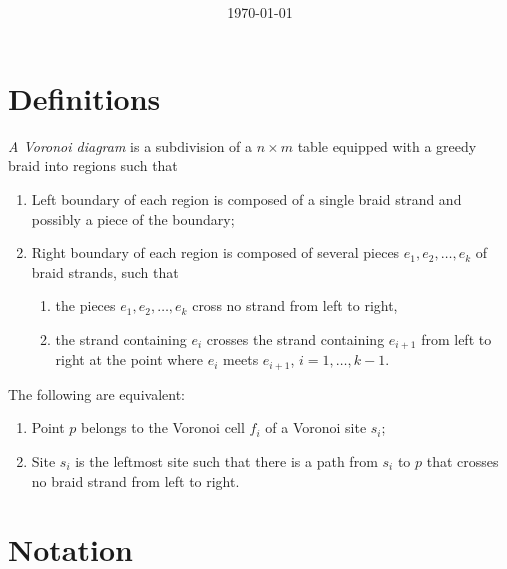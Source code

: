 \documentclass[a4paper,11pt]{article}
\title{ }
\author{ }
\date{\today}
\begin{document}
 \maketitle

\section{Definitions}

\begin{definition}
	\emph{A Voronoi diagram} is a subdivision of a \(n \times m\) table equipped with a greedy braid into regions such that
   \begin{enumerate}
	\item Left boundary of each region is composed of a single braid strand and possibly a piece of the boundary;
	\item Right boundary of each region is composed of several pieces \(e_1, e_2, \ldots, e_k\) of braid strands, such that \begin{enumerate}
	   \item the pieces \(e_1, e_2, \ldots, e_k\) cross no strand from left to right,
	   \item the strand containing \(e_i\) crosses the strand containing \(e_{i+1}\) from left to right at the point where \(e_i\) meets \(e_{i+1}\), \(i = 1,\ldots, k-1\).
	\end{enumerate}
   \end{enumerate}
\end{definition}

\begin{lemma}
	The following are equivalent:
   \begin{enumerate}
	\item Point \(p\) belongs to the Voronoi cell \(f_i\) of a Voronoi site \(s_i\);
	\item Site \(s_i\) is the leftmost site such that there is a path from \(s_i\) to \(p\) that crosses no braid strand from left to right.
   \end{enumerate}
\end{lemma}

\section{Notation}

\newcommand{\VD}{\ensuremath{\text{\sffamily VD}}\xspace}
\newcommand{\braid}{\ensuremath{\mathcal{B}}\xspace}
\end{document}
